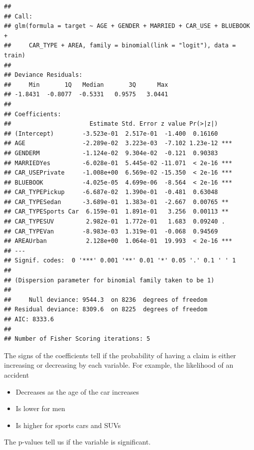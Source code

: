 \documentclass[openany]{book}
\newenvironment{Shaded}{\begin{snugshade}}{\end{snugshade}}
\newcommand{\KeywordTok}[1]{\textcolor[rgb]{0.13,0.29,0.53}{\textbf{#1}}}
\newcommand{\NormalTok}[1]{#1}
\newcommand{\OperatorTok}[1]{\textcolor[rgb]{0.81,0.36,0.00}{\textbf{#1}}}
\newcommand{\StringTok}[1]{\textcolor[rgb]{0.31,0.60,0.02}{#1}}
\providecommand{\tightlist}{%
  \setlength{\itemsep}{0pt}\setlength{\parskip}{0pt}}
\begin{document}
\begin{Shaded}
\end{Shaded}

\begin{verbatim}
## 
## Call:
## glm(formula = target ~ AGE + GENDER + MARRIED + CAR_USE + BLUEBOOK + 
##     CAR_TYPE + AREA, family = binomial(link = "logit"), data = train)
## 
## Deviance Residuals: 
##     Min       1Q   Median       3Q      Max  
## -1.8431  -0.8077  -0.5331   0.9575   3.0441  
## 
## Coefficients:
##                      Estimate Std. Error z value Pr(>|z|)    
## (Intercept)        -3.523e-01  2.517e-01  -1.400  0.16160    
## AGE                -2.289e-02  3.223e-03  -7.102 1.23e-12 ***
## GENDERM            -1.124e-02  9.304e-02  -0.121  0.90383    
## MARRIEDYes         -6.028e-01  5.445e-02 -11.071  < 2e-16 ***
## CAR_USEPrivate     -1.008e+00  6.569e-02 -15.350  < 2e-16 ***
## BLUEBOOK           -4.025e-05  4.699e-06  -8.564  < 2e-16 ***
## CAR_TYPEPickup     -6.687e-02  1.390e-01  -0.481  0.63048    
## CAR_TYPESedan      -3.689e-01  1.383e-01  -2.667  0.00765 ** 
## CAR_TYPESports Car  6.159e-01  1.891e-01   3.256  0.00113 ** 
## CAR_TYPESUV         2.982e-01  1.772e-01   1.683  0.09240 .  
## CAR_TYPEVan        -8.983e-03  1.319e-01  -0.068  0.94569    
## AREAUrban           2.128e+00  1.064e-01  19.993  < 2e-16 ***
## ---
## Signif. codes:  0 '***' 0.001 '**' 0.01 '*' 0.05 '.' 0.1 ' ' 1
## 
## (Dispersion parameter for binomial family taken to be 1)
## 
##     Null deviance: 9544.3  on 8236  degrees of freedom
## Residual deviance: 8309.6  on 8225  degrees of freedom
## AIC: 8333.6
## 
## Number of Fisher Scoring iterations: 5
\end{verbatim}

The signs of the coefficients tell if the probability of having a claim is either increasing or decreasing by each variable. For example, the likelihood of an accident

\begin{itemize}
\tightlist
\item
  Decreases as the age of the car increases
\item
  Is lower for men
\item
  Is higher for sports cars and SUVs
\end{itemize}

The p-values tell us if the variable is significant.
\end{document}
